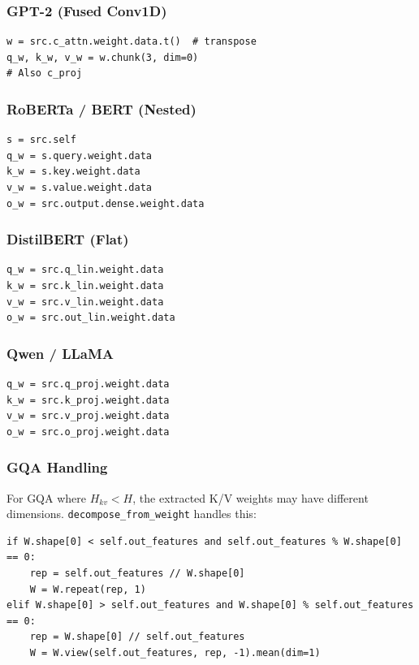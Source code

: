 \subsubsection{GPT-2 (Fused Conv1D)}

\begin{lstlisting}
w = src.c_attn.weight.data.t()  # transpose
q_w, k_w, v_w = w.chunk(3, dim=0)
# Also c_proj
\end{lstlisting}

\subsubsection{RoBERTa / BERT (Nested)}

\begin{lstlisting}
s = src.self
q_w = s.query.weight.data
k_w = s.key.weight.data
v_w = s.value.weight.data
o_w = src.output.dense.weight.data
\end{lstlisting}

\subsubsection{DistilBERT (Flat)}

\begin{lstlisting}
q_w = src.q_lin.weight.data
k_w = src.k_lin.weight.data
v_w = src.v_lin.weight.data
o_w = src.out_lin.weight.data
\end{lstlisting}

\subsubsection{Qwen / LLaMA}

\begin{lstlisting}
q_w = src.q_proj.weight.data
k_w = src.k_proj.weight.data
v_w = src.v_proj.weight.data
o_w = src.o_proj.weight.data
\end{lstlisting}

\subsubsection{GQA Handling}

For GQA where $H_{kv} < H$, the extracted K/V weights may have different 
dimensions. \texttt{decompose\_from\_weight} handles this:

\begin{lstlisting}
if W.shape[0] < self.out_features and self.out_features % W.shape[0] == 0:
    rep = self.out_features // W.shape[0]
    W = W.repeat(rep, 1)
elif W.shape[0] > self.out_features and W.shape[0] % self.out_features == 0:
    rep = W.shape[0] // self.out_features
    W = W.view(self.out_features, rep, -1).mean(dim=1)
\end{lstlisting}

